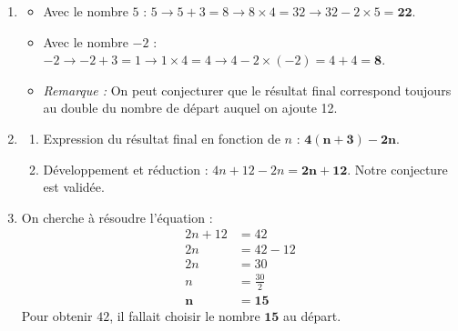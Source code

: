 \documentclass[a4paper]{book}
\begin{document}
    
    \begin{exercice}
        \begin{enumerate}
            \item 
            \begin{itemize}
                \item Avec le nombre $5$ : $5 \longrightarrow 5 + 3 = 8 \longrightarrow 8 \times 4 = 32 \longrightarrow 32 - 2 \times 5 = \mathbf{22}$.
                \item Avec le nombre $-2$ : $-2 \longrightarrow -2 + 3 = 1 \longrightarrow 1 \times 4 = 4 \longrightarrow 4 - 2 \times (-2) = 4 + 4 = \mathbf{8}$.
                \item \textit{Remarque :} On peut conjecturer que le résultat final correspond toujours au double du nombre de départ auquel on ajoute 12.
            \end{itemize}
            \item 
            \begin{enumerate}
                \item Expression du résultat final en fonction de $n$ : $\mathbf{4(n + 3) - 2n}$.
                \item Développement et réduction : $4n + 12 - 2n = \mathbf{2n + 12}$. Notre conjecture est validée.
            \end{enumerate}
            \item On cherche à résoudre l'équation :
            \begin{align*}
                2n + 12 &= 42 \\
                2n &= 42 - 12 \\
                2n &= 30 \\
                n &= \frac{30}{2} \\
                \mathbf{n} &\mathbf{= 15}
            \end{align*}
            Pour obtenir $42$, il fallait choisir le nombre $\mathbf{15}$ au départ.
        \end{enumerate}
    \end{exercice}
\end{document}
